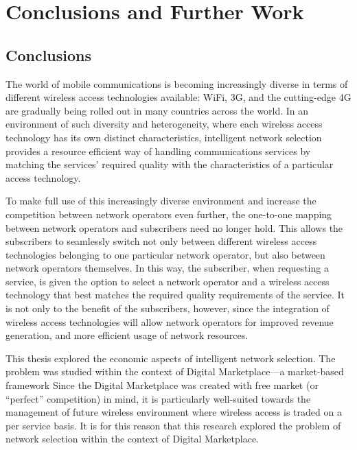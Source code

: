 \chapter{Conclusions and Further Work}
\label{cha:conclusions}

\section{Conclusions} %
\label{sec:conclusions_conclusions}
The world of mobile communications is becoming increasingly diverse in terms of different wireless access technologies available: WiFi, 3G, and the cutting-edge 4G are gradually being rolled out in many countries across the world. In an environment of such diversity and heterogeneity, where each wireless access technology has its own distinct characteristics, intelligent network selection provides a resource efficient way of handling communications services by matching the services' required quality with the characteristics of a particular access technology.

To make full use of this increasingly diverse environment and increase the competition between network operators even further, the one-to-one mapping between network operators and subscribers need no longer hold. This allows the subscribers to seamlessly switch not only between different wireless access technologies belonging to one particular network operator, but also between network operators themselves. In this way, the subscriber, when requesting a service, is given the option to select a network operator and a wireless access technology that best matches the required quality requirements of the service. It is not only to the benefit of the subscribers, however, since the integration of wireless access technologies will allow network operators for improved revenue generation, and more efficient usage of network resources.

This thesis explored the economic aspects of intelligent network selection. The problem was studied within the context of Digital Marketplace---a  market-based framework  Since the Digital Marketplace was created with free market (or ``perfect'' competition) in mind, it is particularly well-suited towards the management of future wireless environment where wireless access is traded on a per service basis. It is for this reason that this research explored the problem of network selection within the context of Digital Marketplace.

